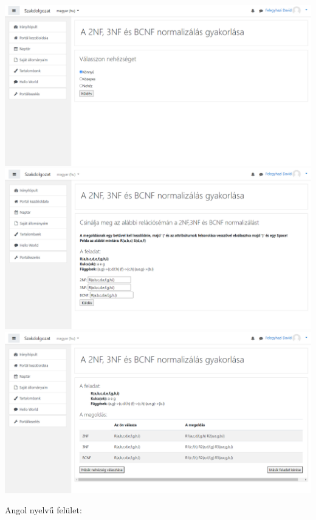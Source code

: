 \begin{center}
    \includegraphics[scale=0.4]{Fejezetek/Images/magyar01.png}
    \hfill \break
    \includegraphics[scale=0.4]{Fejezetek/Images/magyar02.png}
    \hfill \break
    \includegraphics[scale=0.4]{Fejezetek/Images/magyar03.png}
\end{center}

Angol nyelvű felület:

